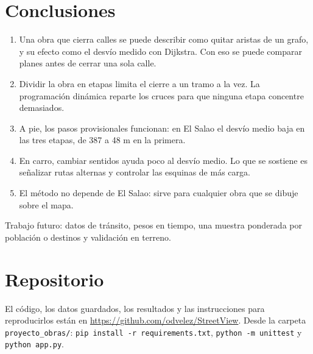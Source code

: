 \documentclass[12pt,letterpaper]{article}
\newcommand{\repo}{\url{https://github.com/odvelez/StreetView}}
\begin{document}
\section{Conclusiones}
\begin{enumerate}
\item Una obra que cierra calles se puede describir como quitar aristas de un grafo, y su efecto como el desvío medido con Dijkstra. Con eso se puede comparar planes antes de cerrar una sola calle.
\item Dividir la obra en etapas limita el cierre a un tramo a la vez. La programación dinámica reparte los cruces para que ninguna etapa concentre demasiados.
\item A pie, los pasos provisionales funcionan: en El Salao el desvío medio baja en las tres etapas, de 387 a 48 m en la primera.
\item En carro, cambiar sentidos ayuda poco al desvío medio. Lo que se sostiene es señalizar rutas alternas y controlar las esquinas de más carga.
\item El método no depende de El Salao: sirve para cualquier obra que se dibuje sobre el mapa.
\end{enumerate}
Trabajo futuro: datos de tránsito, pesos en tiempo, una muestra ponderada por población o destinos y validación en terreno.

\section*{Repositorio}
El código, los datos guardados, los resultados y las instrucciones para reproducirlos están en \repo. Desde la carpeta \texttt{proyecto\_obras/}: \texttt{pip install -r requirements.txt}, \texttt{python -m unittest} y \texttt{python app.py}.
\end{document}
